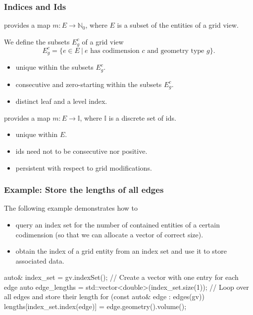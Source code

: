 \documentclass[aspectratio=169,11pt]{beamer}
\theoremstyle{definition}
\begin{document}
\begin{frame}
  \frametitle{Indices and Ids}

  provides a map $m : E \to \mathbb{N}_0$,
  where $E$ is a subset of the entities of a grid view.

  We define the subsets $E_g^c$ of a grid view
  \[ E_g^c = \{e\in E \ | \ \textrm{$e$ has codimension $c$ and geometry type $g$} \}.\]

  \begin{itemize}
  \item unique within the subsets $E_g^c$.
  \item consecutive and zero-starting within the subsets $E_g^c$.
  \item distinct leaf and a level index.
  \end{itemize}

  \medskip
  \pause
  provides a map $m : E \to \mathbb{I}$, where $\mathbb{I}$ is a discrete
  set of ids.

  \begin{itemize}
  \item unique within $E$.
  \item ids need not to be consecutive nor positive.
  \item persistent with respect to grid modifications.
  \end{itemize}

\end{frame}

\begin{frame}[fragile]
  \frametitle{Example: Store the lengths of all edges}
  The following example demonstrates how to
  \begin{itemize}
  \item query an index set for the number of contained
    entities of a certain codimension (so that we can allocate a vector of correct size).
  \item obtain the index of a grid entity from an index set and use it to store associated data.
  \end{itemize}
  \begin{cppcode}
auto& index_set = gv.indexSet();
// Create a vector with one entry for each edge
auto edge_lengths = std::vector<double>(index_set.size(1));
// Loop over all edges and store their length
for (const auto& edge : edges(gv))
  lengths[index_set.index(edge)] = edge.geometry().volume();
\end{cppcode}
\end{frame}
\end{document}
